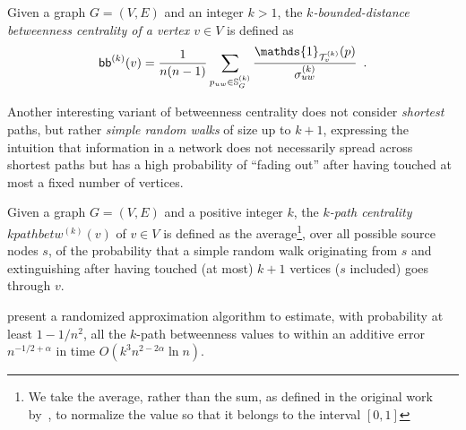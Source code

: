 \begin{definition}\label{def:kboundbetweenness}
 
  Given a graph $G=(V,E)$ and an integer $k>1$, the \emph{$k$-bounded-distance betweenness
  centrality of a vertex $v\in V$} is defined as
  \[
  \kboundbetw^{(k)}(v)=\frac{1}{n(n-1)}\sum_{p_{uw}\in\mathbb{S}^{(k)}_G}\frac{\mathds{1}_{\mathcal{T}^{(k)}_v}(p)}{\sigma^{(k)}_{uw}}
  \enspace.
  \]
\end{definition}

Another interesting variant of betweenness centrality does not consider
\emph{shortest} paths, but rather \emph{simple random walks} of size up to
$k+1$, expressing the intuition that information in a network does not
necessarily spread across shortest paths but has a high probability of ``fading
out'' after having touched at most a fixed number of vertices.

\begin{definition}\label{def:kpathbetweenness}
 Given a graph $G=(V,E)$ and a positive integer $k$, the \emph{$k$-path
 centrality} $kpathbetw^{(k)}(v)$ of $v\in V$ is defined as the average\footnote{We take the
 average, rather than the sum, as defined in the original work
 by~\citet{KourtellisASIT12}, to normalize the value so that it belongs to the interval
 $[0,1]$}, over all possible source
 nodes $s$, of the probability that a simple random walk originating from
 $s$ and extinguishing after having touched (at most) $k+1$ vertices ($s$
 included) goes through $v$.
\end{definition}

\citet{KourtellisASIT12} present a randomized approximation algorithm to
estimate, with probability at least $1-1/n^2$, all the $k$-path betweenness
values to within an additive error $n^{-1/2+\alpha}$ in time
$O(k^3n^{2-2\alpha}\ln n)$.

